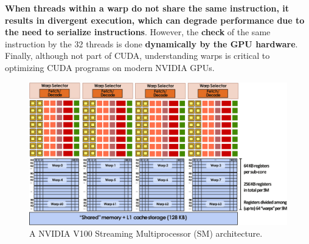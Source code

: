 \highspace
\textbf{When threads within a warp do not share the same instruction, it results in divergent execution, which can degrade performance due to the need to serialize instructions}. However, the \textbf{check} of the same instruction by the 32 threads is done \textbf{dynamically by the GPU hardware}. Finally, although not part of CUDA, understanding warps is critical to optimizing CUDA programs on modern NVIDIA GPUs.

\highspace
\begin{figure}[!htp]
    \centering
    \includegraphics[width=\textwidth]{img/nvidia-v100-sm-2.pdf}
    \caption{A NVIDIA V100 Streaming Multiprocessor (SM) architecture.}
\end{figure}
